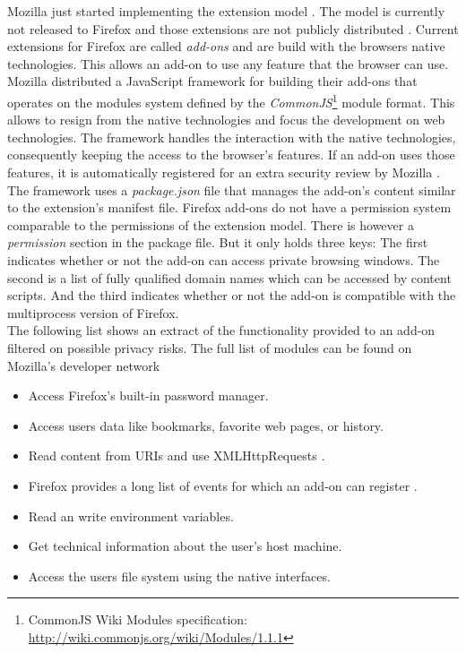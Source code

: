 \documentclass[article,colorback,accentcolor=tud9c,type=bsc]{tudthesis}
\begin{document}
	Mozilla just started implementing the extension model \cite{mozillaBlogWebExtension}. The model is currently not released to Firefox and those extensions are not publicly distributed \cite{mozillaWebExtensionStatus}. Current extensions for Firefox are called \textit{add-ons} and are build with the browsers native technologies. This allows an add-on to use any feature that the browser can use. Mozilla distributed a JavaScript framework for building their add-ons that operates on the modules system defined by the \textit{CommonJS}\footnote{CommonJS Wiki Modules specification: \url{http://wiki.commonjs.org/wiki/Modules/1.1.1}} module format. This allows to resign from the native technologies and focus the development on web technologies. The framework handles the interaction with the native technologies, consequently keeping the access to the browser's features. If an add-on uses those features, it is automatically registered for an extra security review by Mozilla \cite{mozillaDevChromeAuthority}. \\
	The framework uses a \textit{package.json} file that manages the add-on's content similar to the extension's manifest file. Firefox add-ons do not have a permission system comparable to the permissions of the extension model. There is however a \textit{permission} section in the package file. But it only holds three keys: The first indicates whether or not the add-on can access private browsing windows. The second is a list of fully qualified domain names which can be accessed by content scripts. And the third indicates whether or not the add-on is compatible with the multiprocess version of Firefox. \\
	
	The following list shows an extract of the functionality provided to an add-on filtered on possible privacy risks. The full list of modules can be found on Mozilla's developer network \cite{mozillaDevHighLevelApiList, mozillaDevLowLevelApiList} 
	\begin{itemize}
		\item Access Firefox's built-in password manager.
		\item Access users data like bookmarks, favorite web pages, or history.
		\item Read content from URIs and use XMLHttpRequests \cite{w3cXMLHttpRequest}.
		\item Firefox provides a long list of events for which an add-on can register \cite{mozillaDevSystemEvents}.
		\item Read an write environment variables.
		\item Get technical information about the user's host machine.
		\item Access the users file system using the native interfaces.
	\end{itemize}
	
\end{document}
